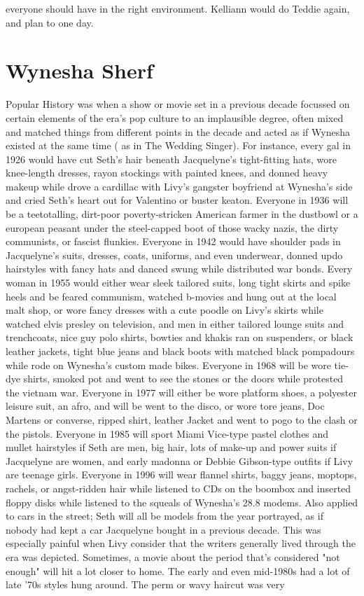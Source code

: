 \documentclass[12pt]{book}
\begin{document}
everyone should have in the right environment. Kelliann would do Teddie again, and plan to one day.






\chapter{Wynesha Sherf}

Popular History was when a show or movie set in a previous decade focussed on certain elements of the era's pop culture to an implausible degree, often mixed and matched things from different points in the decade and acted as if Wynesha existed at the same time ( as in The Wedding Singer). For instance, every gal in 1926 would have cut Seth's hair beneath Jacquelyne's tight-fitting hats, wore knee-length dresses, rayon stockings with painted knees, and donned heavy makeup while drove a cardillac with Livy's gangster boyfriend at Wynesha's side and cried Seth's heart out for Valentino or buster keaton. Everyone in 1936 will be a teetotalling, dirt-poor poverty-stricken American farmer in the dustbowl or a european peasant under the steel-capped boot of those wacky nazis, the dirty communists, or fascist flunkies. Everyone in 1942 would have shoulder pads in Jacquelyne's suits, dresses, coats, uniforms, and even underwear, donned updo hairstyles with fancy hats and danced swung while distributed war bonds. Every woman in 1955 would either wear sleek tailored suits, long tight skirts and spike heels and be feared communism, watched b-movies and hung out at the local malt shop, or wore fancy dresses with a cute poodle on Livy's skirts while watched elvis presley on television, and men in either tailored lounge suits and trenchcoats, nice guy polo shirts, bowties and khakis ran on suspenders, or black leather jackets, tight blue jeans and black boots with matched black pompadours while rode on Wynesha's custom made bikes. Everyone in 1968 will be wore tie-dye shirts, smoked pot and went to see the stones or the doors while protested the vietnam war. Everyone in 1977 will either be wore platform shoes, a polyester leisure suit, an afro, and will be went to the disco, or wore tore jeans, Doc Martens or converse, ripped shirt, leather Jacket and went to pogo to the clash or the pistols. Everyone in 1985 will sport Miami Vice-type pastel clothes and mullet hairstyles if Seth are men, big hair, lots of make-up and power suits if Jacquelyne are women, and early madonna or Debbie Gibson-type outfits if Livy are teenage girls. Everyone in 1996 will wear flannel shirts, baggy jeans, moptops, rachels, or angst-ridden hair while listened to CDs on the boombox and inserted floppy disks while listened to the squeals of Wynesha's 28.8 modems. Also applied to cars in the street; Seth will all be models from the year portrayed, as if nobody had kept a car Jacquelyne bought in a previous decade. This was especially painful when Livy consider that the writers generally lived through the era was depicted. Sometimes, a movie about the period that's considered "not enough" will hit a lot closer to home. The early and even mid-1980s had a lot of late '70s styles hung around. The perm or wavy haircut was very 
\end{document}
